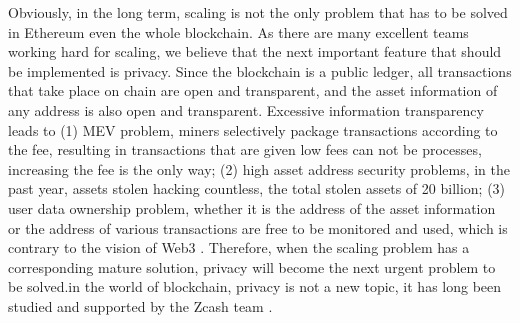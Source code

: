 Obviously, in the long term, scaling is not the only problem that has to be solved in Ethereum\cite{website:Ethereum} even the whole blockchain. As there are
many excellent teams working hard for scaling, we believe that the next important feature that should be implemented is privacy. Since the blockchain is 
a public ledger, all transactions that take place on chain are open and transparent, 
and the asset information of any address is also open and transparent. Excessive 
information transparency leads to (1) MEV problem, miners selectively package 
transactions according to the fee, resulting in transactions that are given low fees can not be 
processes, increasing the fee is the only way; (2) high asset address security problems, in the past 
year, assets stolen hacking countless, the total stolen assets of 20 billion; (3) user data 
ownership problem, whether it is the address of the asset information or the address of 
various transactions are free to be monitored and used, which is contrary to 
the vision of Web3\cite{website:Web3} . Therefore, when the scaling problem has a corresponding mature solution, privacy will become the next urgent problem to be solved.in the world of 
blockchain, privacy is not a new topic, it has long been studied and supported by the Zcash team \cite{website:Zcash}.




